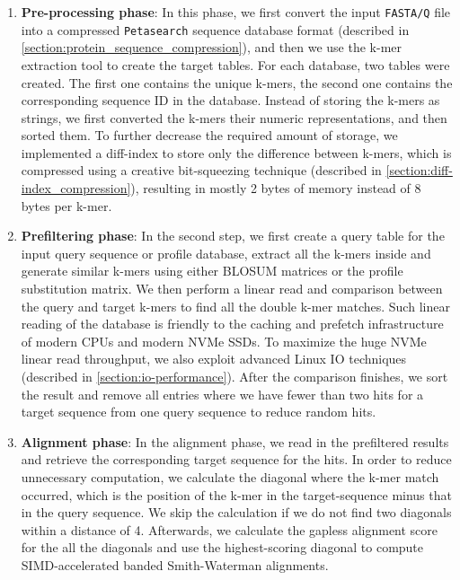 \begin{enumerate}[leftmargin=*]
  \item \textbf{Pre-processing phase}:
        In this phase, we first convert the input \texttt{FASTA/Q} file into a compressed \texttt{Petasearch} sequence database format (described in \cref{section:protein_sequence_compression}), and then we use the k-mer extraction tool to create the target tables.
        For each database, two tables were created.
        The first one contains the unique k-mers, the second one contains the corresponding sequence ID in the database.
        Instead of storing the k-mers as strings, we first converted the k-mers their numeric representations, and then sorted them.
        To further decrease the required amount of storage, we implemented a diff-index to store only the difference between k-mers, which is compressed using a creative bit-squeezing technique (described in \cref{section:diff-index_compression}), resulting in mostly 2 bytes of memory instead of 8 bytes per k-mer.
  \item \textbf{Prefiltering phase}: In the second step, we first create a query table for the input query sequence or profile database, extract all the k-mers inside and generate similar k-mers using either BLOSUM \cite{henikoff_amino_1992} matrices or the profile substitution matrix.
        We then perform a linear read and comparison between the query and target k-mers to find all the double k-mer matches. Such linear reading of the database is friendly to the caching and prefetch infrastructure of modern CPUs and modern NVMe SSDs.
        To maximize the huge NVMe linear read throughput, we also exploit advanced Linux IO techniques (described in \cref{section:io-performance}).
        After the comparison finishes, we sort the result and remove all entries where we have fewer than two hits for a target sequence from one query sequence to reduce random hits.
  \item \textbf{Alignment phase}: In the alignment phase, we read in the prefiltered results and retrieve the corresponding target sequence for the hits. In order to reduce unnecessary computation, we calculate the diagonal where the k-mer match occurred, which is the position of the k-mer in the target-sequence minus that in the query sequence.
  We skip the calculation if we do not find two diagonals within a distance of 4. Afterwards, we calculate the gapless alignment score for the all the diagonals and use the highest-scoring diagonal to compute SIMD-accelerated banded Smith-Waterman alignments.
\end{enumerate}

